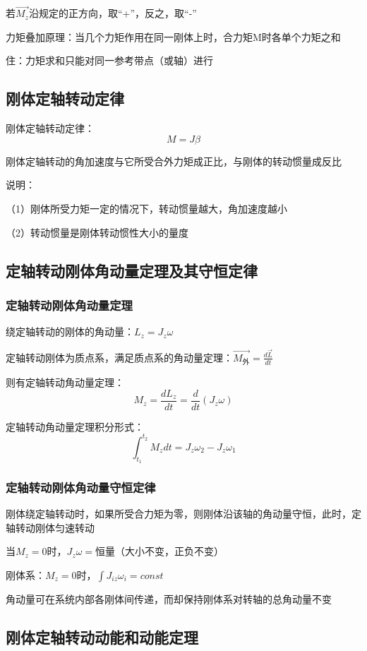 \documentclass[UTF8]{article}
\begin{document}
    若$\vec{M_z}$沿规定的正方向，取“+”，反之，取“-”

    力矩叠加原理：当几个力矩作用在同一刚体上时，合力矩M时各单个力矩之和

    住：力矩求和只能对同一参考带点（或轴）进行

\subsection{刚体定轴转动定律}

    刚体定轴转动定律：\[M = J\beta\]

    刚体定轴转动的角加速度与它所受合外力矩成正比，与刚体的转动惯量成反比

    说明：

    \;\;\;（1）刚体所受力矩一定的情况下，转动惯量越大，角加速度越小

    \;\;（2）转动惯量是刚体转动惯性大小的量度

\subsection{定轴转动刚体角动量定理及其守恒定律}
\subsubsection{定轴转动刚体角动量定理}

    绕定轴转动的刚体的角动量：$L_z = J_z\omega$

    定轴转动刚体为质点系，满足质点系的角动量定理：$\vec{M_{\mbox{外}}} = \frac{d\vec{L}}{dt}$

    则有定轴转动角动量定理：\[M_z = \frac{dL_z}{dt} = \frac{d}{dt}(J_z\omega)\]

    定轴转动角动量定理积分形式：\[\int_{t_1}^{t_2}M_zdt = J_z\omega_2 - J_z\omega_1\]

\subsubsection{定轴转动刚体角动量守恒定律}

    刚体绕定轴转动时，如果所受合力矩为零，则刚体沿该轴的角动量守恒，此时，定轴转动刚体匀速转动

    当$M_z = 0$时，$J_z\omega=$恒量（大小不变，正负不变）

    刚体系：$M_z = 0$时，$\int J_{iz}\omega_i = const$

    角动量可在系统内部各刚体间传递，而却保持刚体系对转轴的总角动量不变

\subsection{刚体定轴转动动能和动能定理}
\newpage
\end{document}
